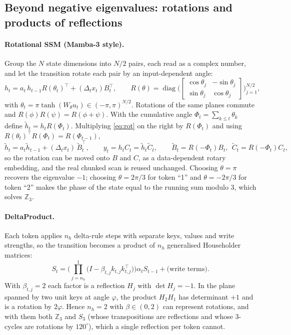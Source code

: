 \subsection{Beyond negative eigenvalues: rotations and products of reflections}
\label{sec:math-ext}
\paragraph{Rotational SSM (Mamba-3 style).} Group the $N$ state dimensions into $N/2$ pairs, each read as a
complex number, and let the transition rotate each pair by an input-dependent angle:
\begin{equation}
  h_t = a_t\, h_{t-1} R(\theta_t)^\top + (\Delta_t x_t) B_t^\top, \qquad
  R(\theta) = \operatorname{diag}\!\Big(\begin{bmatrix}\cos\theta_j & -\sin\theta_j\\ \sin\theta_j & \cos\theta_j\end{bmatrix}\Big)_{j=1}^{N/2},
  \label{eq:rot}
\end{equation}
with $\theta_t = \pi\tanh(W_\theta u_t)\in(-\pi,\pi)^{N/2}$. Rotations of the same planes commute and
$R(\phi)R(\psi)=R(\phi+\psi)$. With the cumulative angle $\Phi_t=\sum_{k\le t}\theta_k$ define
$\tilde h_t = h_t R(\Phi_t)$. Multiplying \eqref{eq:rot} on the right by $R(\Phi_t)$ and using
$R(\theta_t)^\top R(\Phi_t)=R(\Phi_{t-1})$,
\begin{equation}
  \tilde h_t = a_t \tilde h_{t-1} + (\Delta_t x_t)\,\tilde B_t^\top,\qquad y_t = h_tC_t = \tilde h_t \tilde C_t,\qquad
  \tilde B_t = R(-\Phi_t)B_t,\ \ \tilde C_t = R(-\Phi_t)C_t ,
  \label{eq:rope}
\end{equation}
so the rotation can be moved onto $B$ and $C$, as a data-dependent rotary embedding, and the real chunked
scan is reused unchanged. Choosing $\theta=\pi$ recovers the eigenvalue $-1$; choosing $\theta=2\pi/3$ for
token ``1'' and $\theta=-2\pi/3$ for token ``2'' makes the phase of the state equal to the running sum
modulo 3, which solves $\mathbb{Z}_3$.

\paragraph{DeltaProduct.} Each token applies $n_h$ delta-rule steps with separate keys, values and write
strengths, so the transition becomes a product of $n_h$ generalised Householder matrices:
\begin{equation}
  S_t = \Big(\prod_{j=n_h}^{1} \big(I - \beta_{t,j} k_{t,j}k_{t,j}^\top\big)\Big)\alpha_t S_{t-1} + \text{(write terms)}.
  \label{eq:product}
\end{equation}
With $\beta_{t,j}=2$ each factor is a reflection $H_j$ with $\det H_j=-1$. In the plane spanned by two unit
keys at angle $\varphi$, the product $H_2H_1$ has determinant $+1$ and is a rotation by $2\varphi$. Hence
$n_h=2$ with $\beta\in(0,2)$ can represent rotations, and with them both $\mathbb{Z}_3$ and $S_3$ (whose
transpositions are reflections and whose 3-cycles are rotations by $120^\circ$), which a single reflection
per token cannot.

